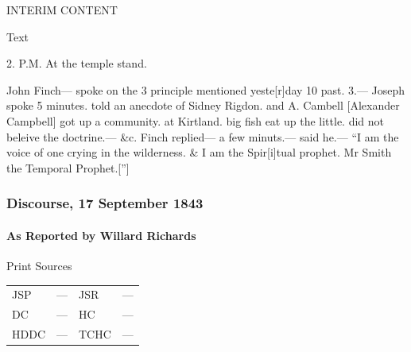 					INTERIM CONTENT
				
				
				\begin{description}
					\item[Text]
				\end{description}
				
					2. P.M. At the temple stand.
					
					John Finch--- spoke on the 3 principle mentioned yeste[r]day 10 past. 3.--- Joseph spoke 5 minutes. told an anecdote of Sidney Rigdon. and A. Cambell [Alexander Campbell] got up a community. at Kirtland. big fish eat up the little. did not beleive the doctrine.--- \&c. Finch replied--- a few minuts.--- said he.--- ``I am the voice of one crying in the wilderness. \& I am the Spir[i]tual prophet. Mr Smith the Temporal Prophet.['']
					
		\subsubsection{Discourse, 17 September 1843}
			\label{EMS-1843-JS-17-SEP-1843}
			
			\paragraph{As Reported by Willard Richards}
				\label{EMS-1843-JS-17-SEP-1843-WR}
			
				\begin{description}
					\item[Print Sources]
				\end{description}

					\begin{tabular}{p{0.5in}p{1in}p{0.5in}p{1in}}
					JSP	 	& ---		& JSR 		& --- \\
					DC	 	& ---		& HC 		& --- \\
					HDDC 	& ---		& TCHC 		& --- \\
					\end{tabular}
				
